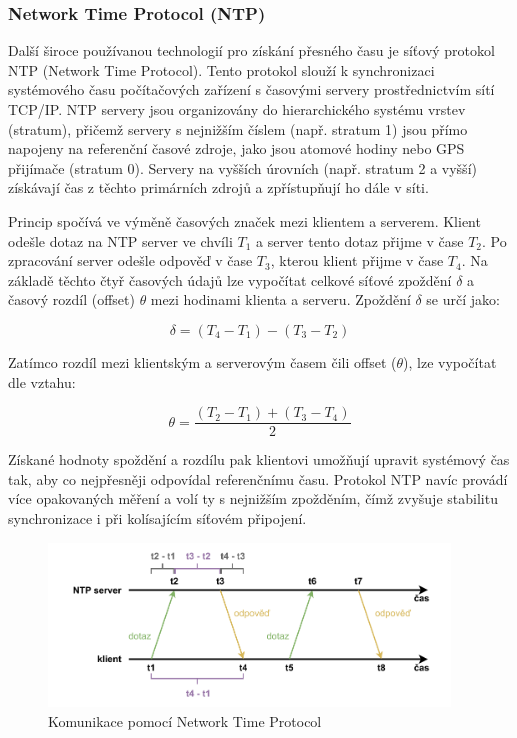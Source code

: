 \subsubsection{Network Time Protocol (NTP)}
Další široce používanou technologií pro získání přesného času je síťový protokol NTP (Network Time Protocol). Tento protokol slouží k synchronizaci systémového času počítačových zařízení s časovými servery prostřednictvím sítí TCP/IP. NTP servery jsou organizovány do hierarchického systému vrstev (stratum), přičemž servery s nejnižším číslem (např. stratum 1) jsou přímo napojeny na referenční časové zdroje, jako jsou atomové hodiny nebo GPS přijímače (stratum 0). Servery na vyšších úrovních (např. stratum 2 a vyšší) získávají čas z těchto primárních zdrojů a zpřístupňují ho dále v síti.

Princip spočívá ve výměně časových značek mezi klientem a serverem. Klient odešle dotaz na NTP server ve chvíli $T_1$ a server tento dotaz přijme v čase $T_2$. Po zpracování server odešle odpověď v čase $T_3$, kterou klient přijme v čase $T_4$. Na základě těchto čtyř časových údajů lze vypočítat celkové síťové zpoždění $\delta$ a časový rozdíl (offset) $\theta$ mezi hodinami klienta a serveru. Zpoždění $\delta$ se určí jako:

\begin{equation}
    \delta = (T_4 - T_1) - (T_3 - T_2)
    \label{eq:ntp_delay}
\end{equation}
    

Zatímco rozdíl mezi klientským a serverovým časem čili offset ($\theta$), lze vypočítat dle vztahu:

\begin{equation}
    \theta = \frac{(T_2 - T_1) + (T_3 - T_4)}{2}
    \label{eq:ntp_offset}
\end{equation}

Získané hodnoty spoždění a rozdílu pak klientovi umožňují upravit systémový čas tak, aby co nejpřesněji odpovídal referenčnímu času. Protokol NTP navíc provádí více opakovaných měření a volí ty s nejnižším zpožděním, čímž zvyšuje stabilitu synchronizace i při kolísajícím síťovém připojení. \cite{sookocheff_ntp}

\begin{figure}[h]
    \centering
    \includegraphics[width=0.95\textwidth]{obrazky-figures/network_time_protocol.pdf}
    
    \caption{Komunikace pomocí Network Time Protocol \cite{sookocheff_ntp}}
    \label{fig:network-time-protocol}
\end{figure}

